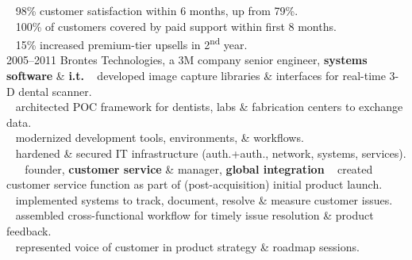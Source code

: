 \documentclass[]{friggeri-cv} %
\begin{document}
\begin{entrylist}
{{\tiny {}} ~ 98\% customer satisfaction within 6 months, up from 79\%.\\
{\tiny {}} ~ 100\% of customers covered by paid support within first 8 months.\\
{\tiny {}} ~ 15\% increased premium-tier upsells in 2\textsuperscript{nd} year.\\}
\entry
{2005--2011}
{Brontes Technologies, a 3M company}
{senior engineer, {\textbf{\color{DarkGray}systems software} \& {\textbf{\color{DarkGray}i.t.}}}}
{{\tiny {}} ~ developed image capture libraries \& interfaces for real-time 3-D dental scanner.\\
{\tiny {}} ~ architected POC framework for dentists, labs \& fabrication centers to exchange data.\\
{\tiny {}} ~ modernized development tools, environments, \& workflows.\\
{\tiny {}} ~ hardened \& secured IT infrastructure (auth.+auth., network, systems, services).}
\entry
{~}
{~}
{founder, \textbf{\color{DarkGray}customer service} \& manager, \textbf{\color{DarkGray}global integration}}
{{\tiny {}} ~ created customer service function as part of (post-acquisition) initial product launch.\\
{\tiny {}} ~ implemented  systems to track, document, resolve \& measure customer issues.\\
{\tiny {}} ~ assembled cross-functional workflow for timely issue resolution \& product feedback.\\
{\tiny {}} ~ represented voice of customer in product strategy \& roadmap sessions.\\

}
\end{entrylist}
\end{document}
